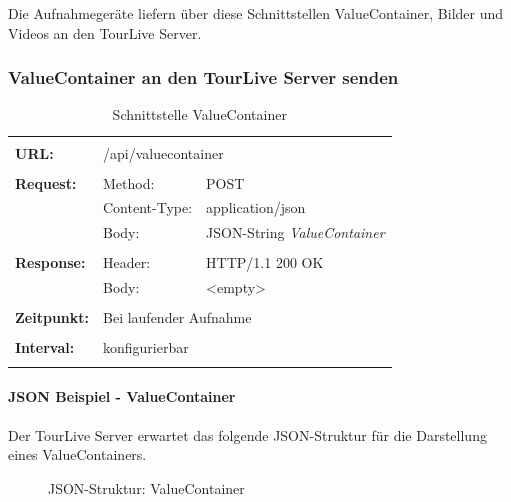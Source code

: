 Die Aufnahmegeräte liefern über diese Schnittstellen ValueContainer, Bilder und Videos an den TourLive Server.

\subsubsection{ValueContainer an den TourLive Server senden}
\begin{longtable}{ p{2.5cm} || p{3.5cm} p{5.5cm}}
&  \\ [-1.5ex]
	\textbf{URL:} & \multicolumn{2}{p{9cm}}{/api/valuecontainer} \\ [1ex] \hline & &  \\ [-1.5ex]
	\textbf{Request:} & Method: & POST \\
		& Content-Type: & application/json \\
		& Body: & JSON-String \textit{ValueContainer}\\ [1ex] \hline & &  \\ [-1.5ex]
	\textbf{Response:} & Header: & HTTP/1.1 200 OK \\
		& Body: & <empty> \\ [1ex] \hline & &  \\ [-1.5ex]
	\textbf{Zeitpunkt:} & \multicolumn{2}{p{9cm}}{Bei laufender Aufnahme} \\ [1ex] \hline & &  \\ [-1.5ex]
	\textbf{Interval:} & \multicolumn{2}{p{9cm}}{konfigurierbar} \\ [1ex] 
	\caption{Schnittstelle ValueContainer}
\end{longtable}

\paragraph{JSON Beispiel - ValueContainer}
Der TourLive Server erwartet das folgende JSON-Struktur für die Darstellung eines ValueContainers.

\begin{figure}[htb]
	\centering
	
	\caption{JSON-Struktur: ValueContainer}
	\label{fig:valuecontainer}
\end{figure}

\newpage
